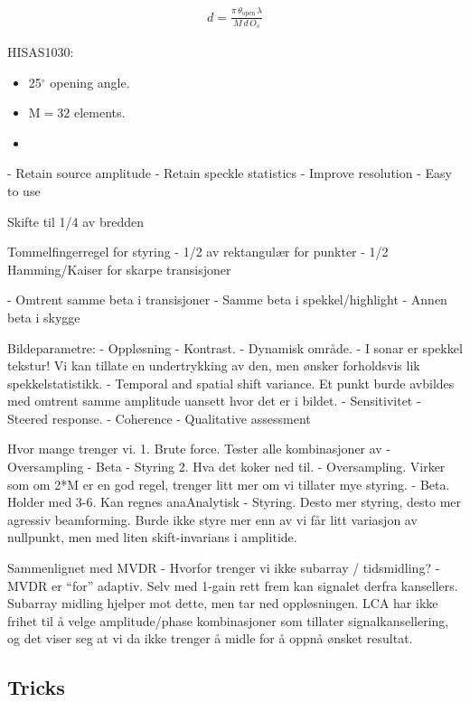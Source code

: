 \begin{align*}
d = \frac{\pi\,\theta_\text{open}\,\lambda}{M\,d\,O_s}
\end{align*}


HISAS1030:
\begin{itemize}
\item 25$^\circ$ opening angle.
\item M$=32$ elements.
\item 
\end{itemize}

- Retain source amplitude
- Retain speckle statistics
- Improve resolution
- Easy to use



Skifte til 1/4 av bredden 



Tommelfingerregel for styring
- 1/2 av rektangulær for punkter
- 1/2 Hamming/Kaiser for skarpe transisjoner

- Omtrent samme beta i transisjoner
- Samme beta i spekkel/highlight
- Annen beta i skygge


Bildeparametre:
- Oppløsning
- Kontrast.
- Dynamisk område.
- I sonar er spekkel tekstur! Vi kan tillate en undertrykking av den, men ønsker forholdsvis lik spekkelstatistikk.
- Temporal and spatial shift variance. Et punkt burde avbildes med omtrent samme amplitude uansett hvor det er i bildet.
- Sensitivitet
- Steered response.
- Coherence
- Qualitative assessment

Hvor mange trenger vi.
1. Brute force. Tester alle kombinasjoner av
   - Oversampling
   - Beta
   - Styring
2. Hva det koker ned til.
   - Oversampling. Virker som om 2*M er en god regel, trenger litt mer om vi tillater mye styring.
   - Beta. Holder med 3-6. Kan regnes anaAnalytisk
   - Styring. Desto mer styring, desto mer agressiv beamforming. Burde ikke styre mer enn av vi får litt variasjon av nullpunkt, men med liten skift-invarians i amplitide.



Sammenlignet med MVDR
- Hvorfor trenger vi ikke subarray / tidsmidling?
- MVDR er ``for'' adaptiv. Selv med 1-gain rett frem kan signalet derfra kansellers. Subarray midling hjelper mot dette, men tar ned oppløsningen. LCA har ikke frihet til å velge amplitude/phase kombinasjoner som tillater signalkansellering, og det viser seg at vi da ikke trenger å midle for å oppnå ønsket resultat.




\subsection{Tricks}

